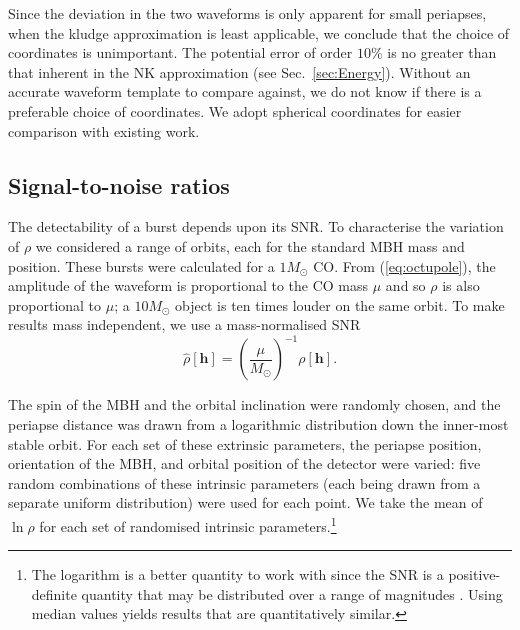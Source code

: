 \documentclass[useAMS,usedcolumn,usegraphicx,usenatbib]{mn2e}
\newcommand{\eqnref}[1]{(\ref{eq:#1})}
\newcommand{\secref}[1]{Sec.~\ref{sec:#1}}
\begin{document}
Since the deviation in the two waveforms is only apparent for small periapses, when the kludge approximation is least applicable, we conclude that the choice of coordinates is unimportant. The potential error of order $10\%$ is no greater than that inherent in the NK approximation (see \secref{Energy}). Without an accurate waveform template to compare against, we do not know if there is a preferable choice of coordinates. We adopt spherical coordinates for easier comparison with existing work.

\subsection{Signal-to-noise ratios}

The detectability of a burst depends upon its SNR. To characterise the variation of $\rho$ we considered a range of orbits, each for the standard MBH mass and position. These bursts were calculated for a $1 M_\odot$ CO. From \eqnref{octupole}, the amplitude of the waveform is proportional to the CO mass $\mu$ and so $\rho$ is also proportional to $\mu$; a $10 M_\odot$ object is ten times louder on the same orbit. To make results mass independent, we use a mass-normalised SNR
\begin{equation}
\hat{\rho}[\boldsymbol{h}] = \left(\frac{\mu}{M_\odot}\right)^{-1}\rho[\boldsymbol{h}].
\end{equation}

The spin of the MBH and the orbital inclination were randomly chosen, and the periapse distance was drawn from a logarithmic distribution down the inner-most stable orbit. For each set of these extrinsic parameters, the periapse position, orientation of the MBH, and orbital position of the detector were varied: five random combinations of these intrinsic parameters (each being drawn from a separate uniform distribution) were used for each point. We take the mean of $\ln \rho$ for each set of randomised intrinsic parameters.\footnote{The logarithm is a better quantity to work with since the SNR is a positive-definite quantity that may be distributed over a range of magnitudes \citep[sections 22.1, 23.3]{MacKay2003}. Using median values yields results that are quantitatively similar.}
\end{document}
